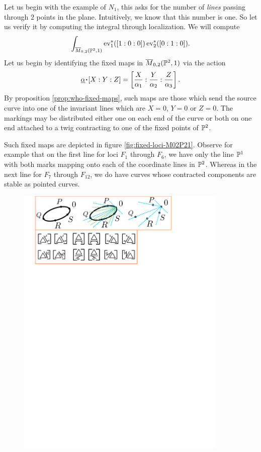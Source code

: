 \documentclass[12pt]{memoir}
\begin{document}
\begin{Ex}
    Let us begin with the example of $N_1$, this asks for the number of \emph{lines} passing through $2$ points in the plane. Intuitively, we know that this number is one. So let us verify it by computing the integral through localization. We will compute 
    $$\int_{\overline{M}_{0,2}(\mathbb{P}^2,1)}\operatorname{ev}_1^\ast([1:0:0])\operatorname{ev}_2^\ast([0:1:0]).$$
    Let us begin by identifying the fixed maps in $\overline{M}_{0,2}(\mathbb{P}^2,1)$ via the action 
    $$\un\al\.[X:Y:Z]=\bonj{\frac{X}{\al_1}:\frac{Y}{\al_2}:\frac{Z}{\al_3}}.$$
    By proposition \ref{prop:who-fixed-maps}, such maps are those which send the source curve into one of the invariant lines which are $X=0$, $Y=0$ or $Z=0$. The markings may be distributed either one on each end of the curve or both on one end attached to a twig contracting to one of the fixed points of $\mathbb{P}^2$.\par
    Such fixed maps are depicted in figure \ref{fig:fixed-loci-M02P21}. Observe for example that on the first line for loci $F_1$ through $F_6$, we have only the line $\mathbb{P}^1$ with both marks mapping onto each of the coordinate lines in $\mathbb{P}^2$. Whereas in the next line for $F_7$ through $F_{12}$, we do have curves whose contracted components are stable as pointed curves.
\begin{figure}[h!]
        \centering
        \includegraphics[width=0.9\textwidth, trim= 1.32cm 21cm 9.1cm 4.1cm,clip]{../figs/FigsDNnotability3.pdf}

\end{figure}
\end{Ex}
\end{document}
